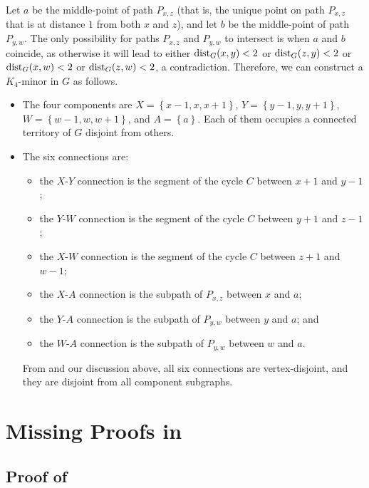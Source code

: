 \documentclass[11pt]{article}
\newcommand{\dist}{\textnormal{dist}}
\newcommand{\set}[1]{\left\{ #1 \right\}}
\begin{document}
Let $a$ be the middle-point of path $P_{x,z}$ (that is, the unique point on path $P_{x,z}$ that is at distance $1$ from both $x$ and $z$), and let $b$ be the middle-point of path $P_{y,w}$. The only possibility for paths $P_{x,z}$ and $P_{y,w}$ to intersect is when $a$ and $b$ coincide, as otherwise it will lead to either $\dist_G(x,y)<2$ or $\dist_G(z,y)<2$ or $\dist_G(x,w)<2$ or $\dist_G(z,w)<2$, a contradiction. Therefore, we can construct a $K_4$-minor in $G$ as follows. 
\begin{itemize}
    \item The four components are $X=\set{x-1,x,x+1}$, $Y=\set{y-1,y,y+1}$, $W=\set{w-1,w,w+1}$, and $A=\set{a}$. Each of them occupies a connected territory of $G$ disjoint from others.
    \item The six connections are:
    \begin{itemize}
        \item the $X$-$Y$ connection is the segment of the cycle $C$ between $x+1$ and $y-1$;
        \item the $Y$-$W$ connection is the segment of the cycle $C$ between $y+1$ and $z-1$;
        \item the $X$-$W$ connection is the segment of the cycle $C$ between $z+1$ and $w-1$;
        \item the $X$-$A$ connection is the subpath of $P_{x,z}$ between $x$ and $a$;
        \item the $Y$-$A$ connection is the subpath of $P_{y,w}$ between $y$ and $a$; and
        \item the $W$-$A$ connection is the subpath of $P_{y,w}$ between $w$ and $a$.
    \end{itemize}
    From  and our discussion above, all six connections are vertex-disjoint, and they are disjoint from all component subgraphs.
\end{itemize}



\section{Missing Proofs in }
\label{sec: ordering proofs}
\subsection*{Proof of }
\end{document}
